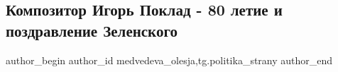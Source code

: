  
 
 
 
 
\subsection{Композитор Игорь Поклад - 80 летие и поздравление Зеленского}
\label{sec:09_12_2021.tg.medvedeva_olesja.1.poklad}


\ifcmt
 author_begin
   author_id medvedeva_olesja,tg.politika_strany
 author_end
\fi

